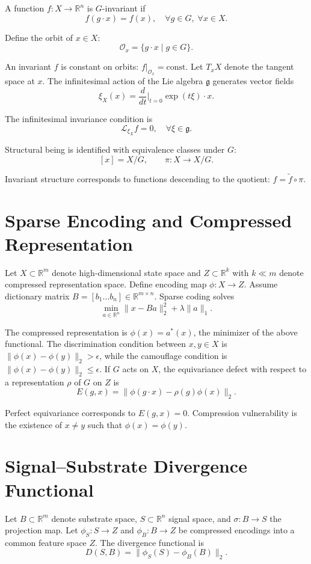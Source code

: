 \documentclass[11pt]{article}
\begin{document}
A function $f : X \to \mathbb{R}^n$ is $G$-invariant if
\[
f(g \cdot x) = f(x), \quad \forall g \in G, \; \forall x \in X.
\]

Define the orbit of $x \in X$:
\[
\mathcal{O}_x = \{ g \cdot x \mid g \in G \}.
\]

An invariant $f$ is constant on orbits: $f|_{\mathcal{O}_x} = \mathrm{const}$. Let $T_xX$ denote the tangent space at $x$. The infinitesimal action of the Lie algebra $\mathfrak{g}$ generates vector fields
\[
\xi_X(x) = \frac{d}{dt}\bigg|_{t=0} \exp(t\xi) \cdot x.
\]

The infinitesimal invariance condition is
\[
\mathcal{L}_{\xi_X} f = 0, \quad \forall \xi \in \mathfrak{g}.
\]

Structural being is identified with equivalence classes under $G$:
\[
[x] = X / G, \qquad \pi : X \to X/G.
\]

Invariant structure corresponds to functions descending to the quotient: $f = \tilde{f} \circ \pi$.

\section{Sparse Encoding and Compressed Representation}

Let $X \subset \mathbb{R}^m$ denote high-dimensional state space and $Z \subset \mathbb{R}^k$ with $k \ll m$ denote compressed representation space. Define encoding map $\phi : X \to Z$. Assume dictionary matrix $B = [b_1 \dots b_n] \in \mathbb{R}^{m \times n}$. Sparse coding solves
\[
\min_{a \in \mathbb{R}^n} \|x - Ba\|_2^2 + \lambda \|a\|_1.
\]

The compressed representation is $\phi(x) = a^*(x)$, the minimizer of the above functional. The discrimination condition between $x, y \in X$ is $\|\phi(x) - \phi(y)\|_2 > \epsilon$, while the camouflage condition is $\|\phi(x) - \phi(y)\|_2 \le \epsilon$. If $G$ acts on $X$, the equivariance defect with respect to a representation $\rho$ of $G$ on $Z$ is
\[
E(g,x) = \|\phi(g \cdot x) - \rho(g)\phi(x)\|_2.
\]

Perfect equivariance corresponds to $E(g,x) = 0$. Compression vulnerability is the existence of $x \ne y$ such that $\phi(x) = \phi(y)$.

\section{Signal--Substrate Divergence Functional}

Let $B \subset \mathbb{R}^m$ denote substrate space, $S \subset \mathbb{R}^n$ signal space, and $\sigma : B \to S$ the projection map. Let $\phi_S : S \to Z$ and $\phi_B : B \to Z$ be compressed encodings into a common feature space $Z$. The divergence functional is
\[
D(S,B) = \|\phi_S(S) - \phi_B(B)\|_2.
\]
\end{document}
